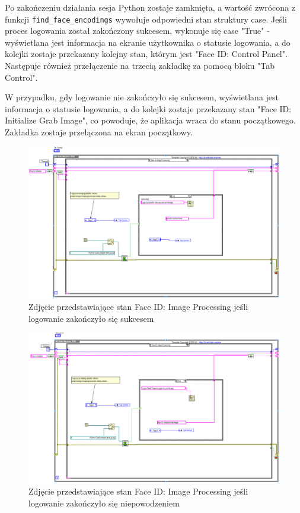 \documentclass{report}
\begin{document}
Po zakończeniu działania sesja Python zostaje zamknięta, a wartość zwrócona z funkcji \newline \texttt{find\_face\_encodings} wywołuje odpowiedni stan struktury case. Jeśli proces logowania został zakończony sukcesem, wykonuje się case "True" - wyświetlana jest informacja na ekranie użytkownika o statusie logowania, a do kolejki zostaje przekazany kolejny stan, którym jest "Face ID: Control Panel". Następuje również przełączenie na trzecią zakładkę za pomocą bloku "Tab Control".

W przypadku, gdy logowanie nie zakończyło się sukcesem, wyświetlana jest informacja o statusie logowania, a do kolejki zostaje przekazany stan "Face ID: Initialize Grab Image", co powoduje, że aplikacja wraca do stanu początkowego. Zakładka zostaje przełączona na ekran początkowy.
 

\begin{figure}[H]
    \centering
    \includegraphics[width=1.0\textwidth]{src/face-id/face-id-image-process.png}
    \caption{Zdjęcie przedstawiające stan Face ID: Image Processing jeśli logowanie zakończyło się sukcesem}
    \label{fig:face_id-process}
\end{figure}

\begin{figure}[H]
    \centering
    \includegraphics[width=1.0\textwidth]{src/face-id/face-id-image-process-2.png}
    \caption{Zdjęcie przedstawiające stan Face ID: Image Processing jeśli logowanie zakończyło się niepowodzeniem}
    \label{fig:face_id-process-2}
\end{figure}
\end{document}
